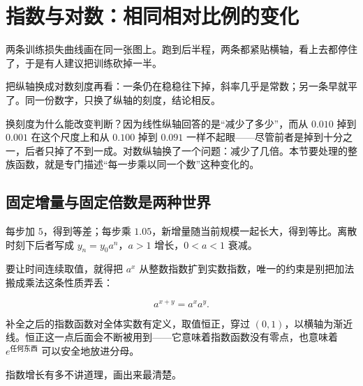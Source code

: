 \section{指数与对数：相同相对比例的变化}
\label{sec:02-Calculus/01-Functions-and-Precalculus/04}

两条训练损失曲线画在同一张图上。跑到后半程，两条都紧贴横轴，看上去都停住了，于是有人建议把训练砍掉一半。

把纵轴换成对数刻度再看：一条仍在稳稳往下掉，斜率几乎是常数；另一条早就平了。同一份数字，只换了纵轴的刻度，结论相反。

换刻度为什么能改变判断？因为线性纵轴回答的是``减少了多少''，而从 \(0.010\) 掉到 \(0.001\) 在这个尺度上和从 \(0.100\) 掉到 \(0.091\) 一样不起眼——尽管前者是掉到十分之一，后者只掉了不到一成。对数纵轴换了一个问题：减少了几倍。本节要处理的整族函数，就是专门描述``每一步乘以同一个数''这种变化的。

\subsection{固定增量与固定倍数是两种世界}

每步加 \(5\)，得到等差；每步乘 \(1.05\)，新增量随当前规模一起长大，得到等比。离散时刻下后者写成 \(y_n=y_0a^n\)，\(a>1\) 增长，\(0<a<1\) 衰减。

要让时间连续取值，就得把 \(a^x\) 从整数指数扩到实数指数，唯一的约束是别把加法搬成乘法这条性质弄丢：

\[
a^{x+y}=a^x a^y .
\]

补全之后的指数函数对全体实数有定义，取值恒正，穿过 \((0,1)\)，以横轴为渐近线。恒正这一点后面会不断被用到——它意味着指数函数没有零点，也意味着 \(e^{\text{任何东西}}\) 可以安全地放进分母。

指数增长有多不讲道理，画出来最清楚。

